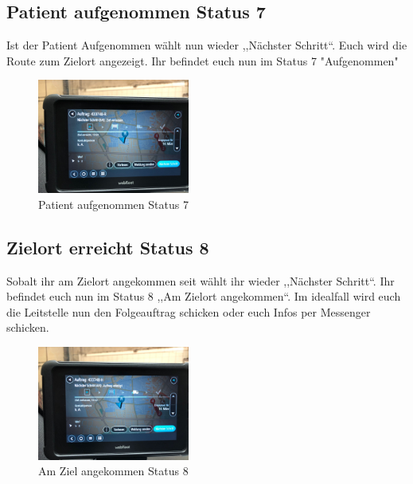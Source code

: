 \documentclass[a4paper,12pt]{scrartcl}
\begin{document}
    \subsection{Patient aufgenommen Status 7}
    Ist der Patient Aufgenommen wählt nun wieder ,,Nächster Schritt``. Euch wird die Route zum Zielort angezeigt.
    Ihr befindet euch nun im Status 7 "Aufgenommen"
    \begin{figure}[h]
        \begin{center}
            \includegraphics[width=5cm]{bilder/aufgenommen.jpg}
            \caption{Patient aufgenommen Status 7}
            \label{Patient aufgenommen}
        \end{center} 
    \end{figure}

    \newpage
    \subsection{Zielort erreicht Status 8}
    Sobalt ihr am Zielort angekommen seit wählt ihr wieder ,,Nächster Schritt``. Ihr befindet euch nun im Status 8 ,,Am Zielort angekommen``.
    Im idealfall wird euch die Leitstelle nun den Folgeauftrag schicken oder euch Infos per Messenger schicken.
    \begin{figure}[h]
        \begin{center}
            \includegraphics[width=5cm]{bilder/angekommen.jpg}
            \caption{Am Ziel angekommen Status 8}
            \label{Ziel}
        \end{center} 
    \end{figure}
\end{document}
